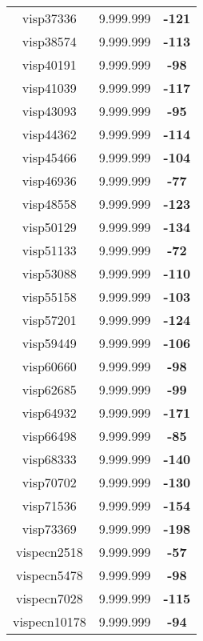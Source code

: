 \begin{tabular}{cc||c}
visp37336        & 9.999.999        & {\bf -121}      \\ 
visp38574        & 9.999.999        & {\bf -113}      \\ 
visp40191        & 9.999.999        & {\bf -98}       \\ 
visp41039        & 9.999.999        & {\bf -117}      \\ 
visp43093        & 9.999.999        & {\bf -95}       \\ 
visp44362        & 9.999.999        & {\bf -114}      \\ 
visp45466        & 9.999.999        & {\bf -104}      \\ 
visp46936        & 9.999.999        & {\bf -77}       \\ 
visp48558        & 9.999.999        & {\bf -123}      \\ 
visp50129        & 9.999.999        & {\bf -134}      \\ 
visp51133        & 9.999.999        & {\bf -72}       \\ 
visp53088        & 9.999.999        & {\bf -110}      \\ 
visp55158        & 9.999.999        & {\bf -103}      \\ 
visp57201        & 9.999.999        & {\bf -124}      \\ 
visp59449        & 9.999.999        & {\bf -106}      \\ 
visp60660        & 9.999.999        & {\bf -98}       \\ 
visp62685        & 9.999.999        & {\bf -99}       \\ 
visp64932        & 9.999.999        & {\bf -171}      \\ 
visp66498        & 9.999.999        & {\bf -85}       \\ 
visp68333        & 9.999.999        & {\bf -140}      \\ 
visp70702        & 9.999.999        & {\bf -130}      \\ 
visp71536        & 9.999.999        & {\bf -154}      \\ 
visp73369        & 9.999.999        & {\bf -198}      \\ 
vispecn2518      & 9.999.999        & {\bf -57}       \\ 
vispecn5478      & 9.999.999        & {\bf -98}       \\ 
vispecn7028      & 9.999.999        & {\bf -115}      \\ 
vispecn10178     & 9.999.999        & {\bf -94}       \\ 

\end{tabular}
